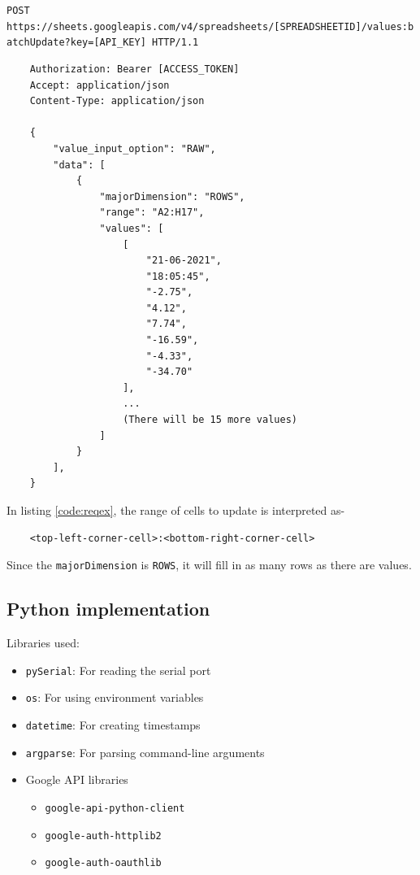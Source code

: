 \documentclass[a4paper,12pt]{report}
\newenvironment{code}{\captionsetup{type=listing}}{}
\newcommand\Smallfont{\fontsize{10}{7.2}\selectfont}
\begin{document}
\pagebreak

\begin{code}
    {\Smallfont \texttt{POST https://sheets.googleapis.com/v4/spreadsheets/[SPREADSHEETID]/values:batchUpdate?key=[API_KEY] HTTP/1.1}}
    \begin{verbatim}
    Authorization: Bearer [ACCESS_TOKEN]
    Accept: application/json
    Content-Type: application/json

    {
        "value_input_option": "RAW",
        "data": [
            {
                "majorDimension": "ROWS",
                "range": "A2:H17",
                "values": [
                    [
                        "21-06-2021",
                        "18:05:45",
                        "-2.75",
                        "4.12",
                        "7.74",
                        "-16.59",
                        "-4.33",
                        "-34.70"
                    ],
                    ...
                    (There will be 15 more values)
                ]
            }
        ],
    }
    \end{verbatim}
    \label{code:reqex}
\end{code}

\vspace{0.5cm}
In listing \ref{code:reqex}, the range of cells to update is interpreted as-
\begin{code}
    \center
    \begin{verbatim}
    <top-left-corner-cell>:<bottom-right-corner-cell>
    \end{verbatim}
\end{code}
Since the \texttt{majorDimension} is \texttt{ROWS}, it will fill in as many
rows as there are values.

\subsection{Python implementation}
Libraries used:
\begin{itemize}
    \item \texttt{pySerial}: For reading the serial port
    \item \texttt{os}: For using environment variables
    \item \texttt{datetime}: For creating timestamps
    \item \texttt{argparse}: For parsing command-line arguments
    \item Google API libraries
        \begin{itemize}
            \item \texttt{google-api-python-client}
            \item \texttt{google-auth-httplib2}
            \item \texttt{google-auth-oauthlib}
        \end{itemize}
\end{itemize}
\end{document}
